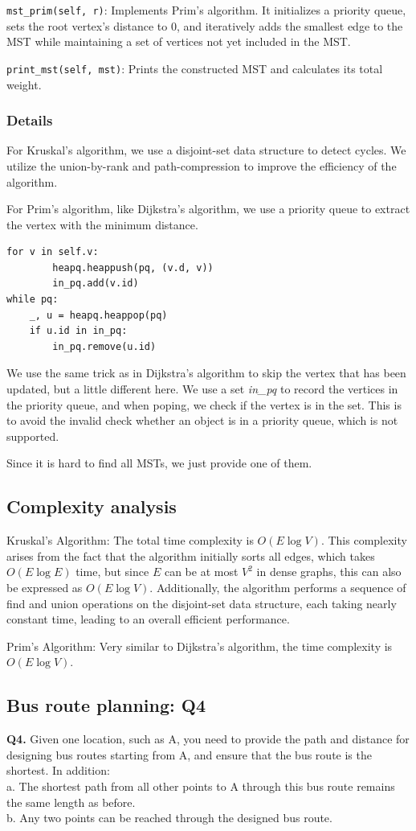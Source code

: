 \documentclass[UTF8]{ctexart}
\begin{document}
\texttt{mst\_prim(self, r)}: Implements Prim's algorithm. It initializes a priority queue, sets the root vertex's distance to 0, and iteratively adds the smallest edge to the MST while maintaining a set of vertices not yet included in the MST.

\texttt{print\_mst(self, mst)}: Prints the constructed MST and calculates its total weight.

\subsubsection*{Details}
For Kruskal's algorithm, we use a disjoint-set data structure to detect cycles. We utilize the union-by-rank and path-compression to improve the efficiency of the algorithm.

For Prim's algorithm, like Dijkstra's algorithm, we use a priority queue to extract the vertex with the minimum distance.
\begin{lstlisting}
for v in self.v:
        heapq.heappush(pq, (v.d, v))
        in_pq.add(v.id)
while pq:
    _, u = heapq.heappop(pq)
    if u.id in in_pq:
        in_pq.remove(u.id)
\end{lstlisting}
We use the same trick as in Dijkstra's algorithm to skip the vertex that has been updated, but a little different here.
We use a set \textit{in\_pq} to record the vertices in the priority queue, and when poping, we check if the vertex is in the set.
This is to avoid the invalid check whether an object is in a priority queue, which is not supported.

Since it is hard to find all MSTs, we just provide one of them.

\subsection*{Complexity analysis}
Kruskal's Algorithm: The total time complexity is \( O(E \log V) \). This complexity arises from the fact that the algorithm initially sorts all edges, which takes \( O(E \log E) \) time, 
but since \( E \) can be at most \( V^2 \) in dense graphs, this can also be expressed as \( O(E \log V) \). 
Additionally, the algorithm performs a sequence of find and union operations on the disjoint-set data structure, each taking nearly constant time, leading to an overall efficient performance.

Prim's Algorithm: Very similar to Dijkstra's algorithm, the time complexity is \( O(E \log V) \).

\subsection{Bus route planning: Q4}
\textbf{Q4.} Given one location, such as A, you need to provide the path and
distance for designing bus routes starting from A, and ensure that the bus
route is the shortest. In addition:\\
a. The shortest path from all other points to A through this bus route
remains the same length as before.\\
b. Any two points can be reached through the designed bus route.\\
\end{document}
